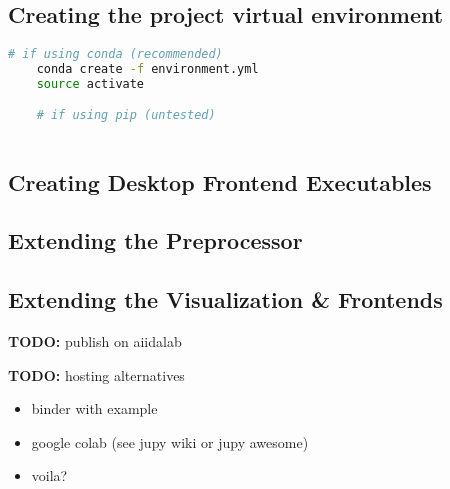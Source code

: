 \subsection{Creating the project virtual environment}
\label{sec:creat-proj-virt}

\begin{lstlisting}[language=bash, style=code]
    # if using conda (recommended)
    conda create -f environment.yml
    source activate 

    # if using pip (untested)
    
\end{lstlisting}

\subsection{Creating Desktop Frontend Executables}
\label{sec:creat-deskt-front}



\subsection{Extending the Preprocessor}
\label{sec:extend-prepr}

\subsection{Extending the Visualization \& Frontends}
\label{sec:extend-visu-}

\textbf{TODO:} publish on aiidalab 

\textbf{TODO:} hosting alternatives
\begin{itemize}
\item binder with example
\item google colab (see jupy wiki or jupy awesome) \cite{jupyter-awesome}
\item voila?
\end{itemize}







